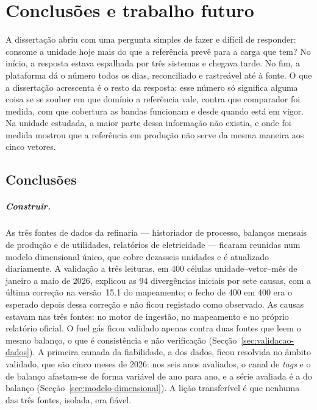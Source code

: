 
\chapter{Conclusões e trabalho futuro}
\label{cha:conclusoes}

A dissertação abriu com uma pergunta simples de fazer e difícil de
responder: consome a unidade hoje mais do que a referência prevê para a carga
que tem? No início, a resposta estava espalhada por três sistemas e chegava
tarde. No fim, a plataforma dá o número todos os dias, reconciliado e
rastreável até à fonte. O que a dissertação acrescenta é o resto da resposta:
esse número só significa alguma coisa se se souber em que domínio a
referência vale, contra que comparador foi medida, com que cobertura as
bandas funcionam e desde quando está em vigor. Na unidade estudada, a maior
parte dessa informação não existia, e onde foi medida mostrou que a
referência em produção não serve da mesma maneira aos cinco vetores.

\section{Conclusões}
\label{sec:conclusoes}

\paragraph{Construir.} As três fontes de dados da refinaria --- historiador
de processo, balanços mensais de produção e de utilidades, relatórios de
eletricidade --- ficaram reunidas num modelo dimensional único, que cobre
dezasseis unidades e é atualizado diariamente. A validação a três leituras,
em 400 células unidade--vetor--mês de janeiro a maio de 2026, explicou as 94
divergências iniciais por sete causas, com a última correção na versão~15.1
do mapeamento; o fecho de 400 em 400 era o esperado depois dessa correção e
não ficou registado como observado. As causas estavam nas três fontes: no
motor de ingestão, no mapeamento e no próprio relatório oficial. O fuel gás
ficou validado apenas contra duas fontes que leem o mesmo balanço, o que é
consistência e não verificação (Secção~\ref{sec:validacao-dados}). A
primeira camada da fiabilidade, a dos dados, ficou resolvida no âmbito
validado, que são cinco meses de 2026: nos seis anos avaliados, o canal de
\emph{tags} e o de balanço afastam-se de forma variável de ano para ano, e a
série avaliada é a do balanço (Secção~\ref{sec:modelo-dimensional}). A lição
transferível é que nenhuma das três fontes, isolada, era fiável.

